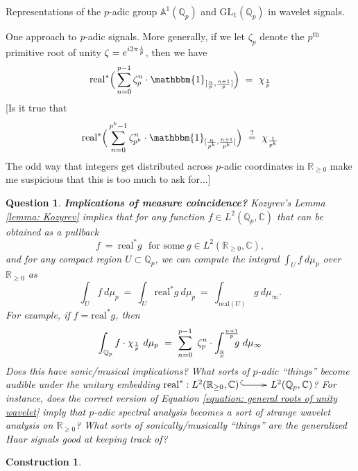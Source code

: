 \documentclass[letterpaper,11pt, reqno]{amsart}
\makeatletter
\newtheorem{monodromy theorem}{Monodromy Theorem}[subsection]
\newtheorem{wild conjecture}[theorem]{Wild Conjecture}
\newtheorem{research objectives}{Research objectives}[subsection]
\newtheorem{question}[theorem]{Question}
\newtheorem{research question}[theorem]{Research questions}
\newtheorem{aside question}[theorem]{Aside question}
\newtheorem{construction}[theorem]{Construction}
\newtheorem{audio example}[theorem]{\loudspeaker[3] Example}
\newtheorem{blank remark}[theorem]{}
\newtheorem{terminology and comment}[theorem]{Terminology and comment}
\newtheorem{purity hypothesis}[theorem]{Purity hypothesis}
\newtheorem{corollary of the purity hypothesis}[theorem]{Corollary of the purity hypothesis}
\newcommand{\CC} {{\mathbb C}}
\newcommand{\QQ} {{\mathbb Q}}
\newcommand{\RR} {{\mathbb R}}
\newcommand{\mono}{\!\xymatrix{{}\ar@{^{(}->}[r]&{}}\!}
\numberwithin{equation}{theorem}
\makeatother
\begin{document}
\begin{section}{Representations of the $p$-adic group $\mathbb{A}^{\!1}(\mathbb{Q}_{p})$
and $\text{GL}_{1}(\mathbb{Q}_{p})$
in wavelet signals.}
\begin{subsection}{One approach to {\em p}-adic signals.}
More generally, if we let $\zeta_p$ denote the $p^\text{th}$ primitive root of unity $\zeta=e^{i2\pi\text{{\smaller\smaller\smaller$\tfrac{1}{p}$}}}$, then we have
	$$
	\text{real}^\ast\Big(\sum_{n=0}^{p-1}\zeta^{n}_p\cdot\mathbbm{1}_{[\text{{\smaller\smaller\smaller $\tfrac{n}{p}$}},\text{{\smaller\smaller\smaller $\tfrac{n+1}{p}$}}]}\Big)
	\ =\ 
	\chi_{\text{{\smaller\smaller\smaller $\tfrac{1}{p}$}}}
	$$
{\color{red} [Is it true that
	\begin{equation}\label{equation: general roots of unity wavelet}
	\text{real}^\ast\Big(\sum_{n=0}^{p^{k}-1}\zeta^{n}_{p^k}\cdot\mathbbm{1}_{[\text{{\smaller\smaller\smaller $\tfrac{n}{p^k}$}},\text{{\smaller\smaller\smaller $\tfrac{n+1}{p^k}$}}]}\Big)
	\ \overset{?}{=}\ 
	\chi_{\text{{\smaller\smaller\smaller $\tfrac{1}{p^k}$}}}
	\end{equation}
The odd way that integers get distributed across $p$-adic coordinates in $\RR_{\ge 0}$ make me suspicious that this is too much to ask for...]}

\begin{question}
{\bf Implications of measure coincidence?}
\normalfont
Kozyrev's Lemma \ref{lemma: Kozyrev} implies that for any function $f\in L^{2}(\QQ_{p}, \CC)$ that can be obtained as a pullback
	$$
	f\ =\ \text{real}^\ast g
	\ \ \ \text{for some}\ g\in L^2(\RR_{\ge0},\CC),
	$$
and for any compact region $U\subset \QQ_{p}$, we can compute the integral $\int_{U}f\ d\mu_p$ over $\RR_{\ge0}$ as
	$$
	\int_{U}f\ d\mu_p
	\ =\ 
	\int_{U}\text{real}^{\ast}\!g\  d\mu_{p}
	\ =\ 
	\int_{\text{real}(U)}g\ d\mu_{\infty}.
	$$
For example, if $f=\text{real}^\ast g$, then
	$$
	\int_{\QQ_{p}}f\cdot\chi_{\text{{\smaller\smaller\smaller $\tfrac{1}{p}$}}}\ d\mu_p
	\ =\ 
	\sum_{n=0}^{p-1}\ \zeta^{n}_p\cdot\int^{\text{{\smaller\smaller\smaller $\tfrac{n+1}{p}$}}}_{\!\text{{\smaller\smaller\smaller $\tfrac{n}{p}$}}}
	\!\!\!\!g\ d\mu_\infty
	$$
Does this have sonic/musical implications? What sorts of $p$-adic ``things'' become audible under the unitary embedding $\text{real}^\ast:L^2(\RR_{\ge0},\CC)\mono L^2(\QQ_{p},\CC)$? For instance, does the correct version of Equation \eqref{equation: general roots of unity wavelet} imply that $p$-adic spectral analysis becomes a sort of strange wavelet analysis on $\RR_{\ge0}$? What sorts of sonically/musically ``things'' are the {\em generalized} Haar signals good at keeping track of?
\end{question}

\begin{construction}
	\normalfont


\end{construction}
\end{subsection}
\end{section}
\end{document}
